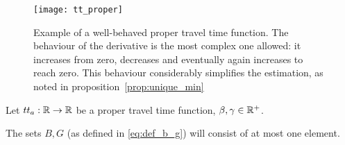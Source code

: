 \begin{figure}
  \centering
  \texttt{[image: tt\_proper]}
  \caption{Example of a well-behaved proper travel time function.
    The behaviour of the derivative is the most complex one allowed:
    it increases from zero, decreases and eventually again increases to reach zero.
  This behaviour considerably simplifies the estimation, as noted in proposition~\ref{prop:unique_min}}
  \label{fig:prop_travel_time}
\end{figure}

\begin{prop}
  \label{prop:unique_min}
  Let \(tt_a:\mathbb{R}\rightarrow\mathbb{R}\) be a proper travel time function, \(\beta, \gamma \in \mathbb{R}^+\).

  The sets \(B, G\) (as defined in \eqref{eq:def_b_g}) will consist of at most one element.
\end{prop}

